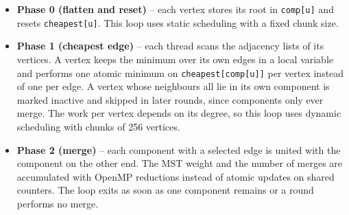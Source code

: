 \documentclass[11pt,a4paper]{article}
\begin{document}
\begin{itemize}
  \item \textbf{Phase 0 (flatten and reset)} -- each vertex stores its root in \texttt{comp[u]} and resets \texttt{cheapest[u]}. This loop uses static scheduling with a fixed chunk size.
  \item \textbf{Phase 1 (cheapest edge)} -- each thread scans the adjacency lists of its vertices. A vertex keeps the minimum over its own edges in a local variable and performs one atomic minimum on \texttt{cheapest[comp[u]]} per vertex instead of one per edge. A vertex whose neighbours all lie in its own component is marked inactive and skipped in later rounds, since components only ever merge. The work per vertex depends on its degree, so this loop uses dynamic scheduling with chunks of 256 vertices.
  \item \textbf{Phase 2 (merge)} -- each component with a selected edge is united with the component on the other end. The MST weight and the number of merges are accumulated with OpenMP reductions instead of atomic updates on shared counters. The loop exits as soon as one component remains or a round performs no merge.
\end{itemize}
\end{document}
